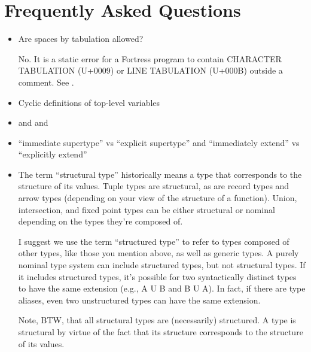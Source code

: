 %
%
%
%

\section{Frequently Asked Questions}

\begin{itemize}
\item Are spaces by tabulation allowed?

No.  It is a static error for a Fortress program to contain CHARACTER TABULATION (U+0009) or LINE TABULATION (U+000B) outside a comment.  See .

\item Cyclic definitions of top-level variables

\item {} and  and 

\item ``immediate supertype'' vs ``explicit supertype'' and
``immediately extend'' vs ``explicitly extend''

\item The term ``structural type'' historically means a type that corresponds to
the structure of its values.  Tuple types are structural, as are record types
and arrow types (depending on your view of the structure of a function).
Union, intersection, and fixed point types can be either structural or
nominal depending on the types they're composed of.

I suggest we use the term ``structured type'' to refer to types composed of
other types, like those you mention above, as well as generic types.
A purely nominal type system can include structured types, but not structural
types.  If it includes structured types, it's possible for two syntactically
distinct types to have the same extension (e.g., A U B and B U A).  In fact,
if there are type aliases, even two unstructured types can have the same
extension.

Note, BTW, that all structural types are (necessarily) structured.  A type
is structural by virtue of the fact that its structure corresponds to the
structure of its values.


\end{itemize}
